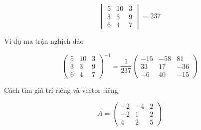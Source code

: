 \documentclass[12pt]{article}
\begin{document}
$$ \begin{vmatrix}
        5 & 10 & 3 \\
        3 & 3  & 9 \\
        6 & 4  & 7
    \end{vmatrix}  = 237 $$

Ví dụ ma trận nghịch đảo

$$ \begin{pmatrix}
        5 & 10 & 3 \\
        3 & 3  & 9 \\
        6 & 4  & 7
    \end{pmatrix}^{-1} = \frac{1}{237} \begin{pmatrix}
        -15 & -58 & 81  \\
        33  & 17  & -36 \\
        -6  & 40  & -15
    \end{pmatrix} $$

\newpage

Cách tìm giá trị riêng và vector riêng

$$ A = \begin{pmatrix}
        -2 & -4 & 2 \\
        -2 & 1  & 2 \\
        4  & 2  & 5
    \end{pmatrix} $$
\end{document}
